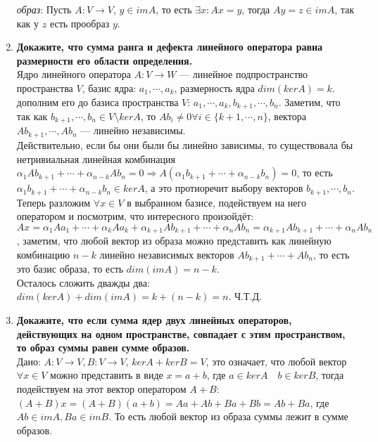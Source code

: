\documentclass[12pt]{article} %
\begin{document}
\begin{enumerate}
    \textit{образ}: Пусть $A: V \rightarrow V$, $y \in imA$, то есть $\exists x: Ax = y$, тогда $Ay = z \in imA$, так как у $z$ есть прообраз $y$.
    
    \item \textbf{Докажите, что сумма ранга и дефекта линейного оператора равна размерности его области определения.}\\

    Ядро линейного оператора $A: V \rightarrow W$ --- линейное подпространство пространства $V$, базис ядра: $a_1, \cdots, a_k$, размерность ядра $dim(kerA) = k$. дополним его до базиса пространства $V$: $a_1, \cdots, a_k, b_{k + 1}, \cdots, b_n$. Заметим, что так как $b_{k + 1}, \cdots, b_n \in V \setminus kerA$, то $Ab_i \neq 0 \forall i \in \{k + 1, \cdots, n\}$, вектора $Ab_{k + 1}, \cdots, Ab_n$ --- линейно независимы.\\
    
    Действительно, если бы они были бы линейно зависимы, то существовала бы нетривиальная линейная комбинация $\alpha_1 Ab_{k + 1} + \cdots + \alpha_{n - k} A b_n = 0 \Rightarrow A(\alpha_1 b_{k + 1} + \cdots + \alpha_{n - k} b_n) = 0$, то есть $\alpha_1 b_{k + 1} + \cdots + \alpha_{n - k} b_n \in kerA$, а это протиоречит выбору векторов $b_{k + 1}, \cdots, b_n$.\\
    
    Теперь разложим $\forall x \in V$ в выбранном базисе, подействуем на него оператором и посмотрим, что интересного произойдёт: $Ax = \alpha_1 Aa_1 + \cdots + \alpha_k Aa_k + \alpha_{k + 1}Ab_{k + 1} + \cdots + \alpha_nAb_n = \alpha_{k + 1}Ab_{k + 1} + \cdots + \alpha_nAb_n$, заметим, что любой вектор из образа можно представить как линейную комбинацию $n - k$ линейно независимых векторов $Ab_{k + 1} + \cdots + Ab_n$, то есть это базис образа, то есть $dim(imA) = n - k$.\\
    
    Осталось сложить дважды два: $dim(kerA) + dim(imA) = k + (n - k) = n$. Ч.Т.Д.
    
    \item \textbf{Докажите, что если сумма ядер двух линейных операторов, действующих на одном пространстве, совпадает с этим пространством, то образ суммы равен сумме образов.}\\

    Дано: $A: V \rightarrow V, B: V \rightarrow V$, $kerA + kerB = V$, это означает, что любой вектор $\forall x \in V$ можно представить в виде $x = a + b$, где $a \in kerA \quad b \in kerB$, тогда подействуем на этот вектор оператором $A + B$: $(A + B)x = (A + B)(a + b) = Aa + Ab + Ba + Bb = Ab + Ba$, где $Ab \in imA, Ba \in imB$. То есть любой вектор из образа суммы лежит в сумме образов.\\
    

\end{enumerate}
\end{document}

